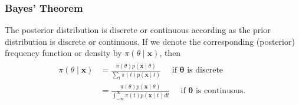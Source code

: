 \documentclass{article}
\begin{document}
\subsubsection{ Bayes' Theorem}\label{sec:bay_thm}
 The posterior distribution is discrete or continuous according as the prior distribution is discrete or continuous.
 If we denote the corresponding (posterior) frequency function or density by $\pi(\theta \mid \mathbf{x})$, then 
 \begin{align*}
\begin{aligned}
\pi(\theta \mid \mathbf{x}) &=\frac{\pi(\theta) p(\mathbf{x} \mid \theta)}{\sum_{t} \pi(t) p(\mathbf{x} \mid t)} \quad \text { if } \boldsymbol{\theta} \text { is discrete } \\
&=\frac{\pi(\theta) p(\mathbf{x} \mid \theta)}{\int_{-\infty}^{\infty} \pi(t) p(\mathbf{x} \mid t) d t} \quad \text { if } \boldsymbol{\theta} \text { is continuous. }
\end{aligned}
\end{align*}
\end{document}
